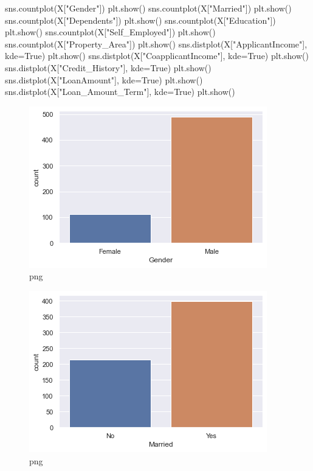 \documentclass[]{article}
\newenvironment{Shaded}{}{}
\newcommand{\NormalTok}[1]{#1}
\newcommand{\OperatorTok}[1]{\textcolor[rgb]{0.40,0.40,0.40}{#1}}
\newcommand{\StringTok}[1]{\textcolor[rgb]{0.25,0.44,0.63}{#1}}
\newcommand{\VariableTok}[1]{\textcolor[rgb]{0.10,0.09,0.49}{#1}}
\begin{document}
\begin{Shaded}
\begin{Highlighting}[]
\NormalTok{sns.countplot(X[}\StringTok{"Gender"}\NormalTok{])}
\NormalTok{plt.show()}
\NormalTok{sns.countplot(X[}\StringTok{"Married"}\NormalTok{])}
\NormalTok{plt.show()}
\NormalTok{sns.countplot(X[}\StringTok{"Dependents"}\NormalTok{])}
\NormalTok{plt.show()}
\NormalTok{sns.countplot(X[}\StringTok{"Education"}\NormalTok{])}
\NormalTok{plt.show()}
\NormalTok{sns.countplot(X[}\StringTok{"Self_Employed"}\NormalTok{])}
\NormalTok{plt.show()}
\NormalTok{sns.countplot(X[}\StringTok{"Property_Area"}\NormalTok{])}
\NormalTok{plt.show()}
\NormalTok{sns.distplot(X[}\StringTok{"ApplicantIncome"}\NormalTok{], kde}\OperatorTok{=}\VariableTok{True}\NormalTok{)}
\NormalTok{plt.show()}
\NormalTok{sns.distplot(X[}\StringTok{"CoapplicantIncome"}\NormalTok{], kde}\OperatorTok{=}\VariableTok{True}\NormalTok{)}
\NormalTok{plt.show()}
\NormalTok{sns.distplot(X[}\StringTok{"Credit_History"}\NormalTok{], kde}\OperatorTok{=}\VariableTok{True}\NormalTok{)}
\NormalTok{plt.show()}
\NormalTok{sns.distplot(X[}\StringTok{"LoanAmount"}\NormalTok{], kde}\OperatorTok{=}\VariableTok{True}\NormalTok{)}
\NormalTok{plt.show()}
\NormalTok{sns.distplot(X[}\StringTok{"Loan_Amount_Term"}\NormalTok{], kde}\OperatorTok{=}\VariableTok{True}\NormalTok{)}
\NormalTok{plt.show()}
\end{Highlighting}
\end{Shaded}

\begin{figure}
\centering
\includegraphics{notebook_files/notebook_21_0.png}
\caption{png}
\end{figure}

\begin{figure}
\centering
\includegraphics{notebook_files/notebook_21_1.png}
\caption{png}
\end{figure}
\end{document}

